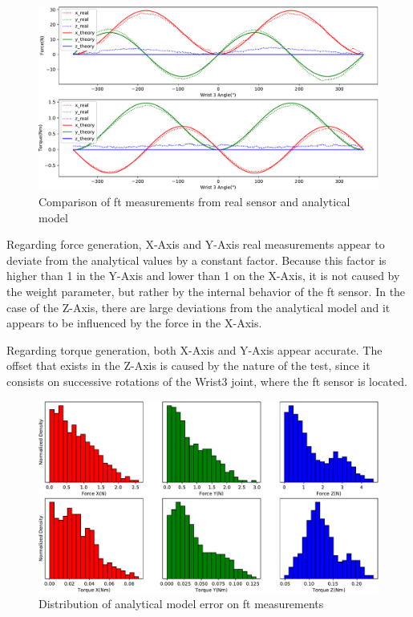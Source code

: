 
\begin{figure}[h]
    \centering
    \includegraphics[width=0.8\linewidth]{figs/chp3/ft_sensor_theory.pdf}
    \caption{Comparison of \ac{ft} measurements from real sensor and analytical model}
    \label{fig:ft_sensor_theory}
\end{figure}

\par Regarding force generation, X-Axis and Y-Axis real measurements appear to deviate from the analytical values by a constant factor. Because this factor is higher than 1 in the Y-Axis and lower than 1 on the X-Axis, it is not caused by the weight parameter, but rather by the internal behavior of the \ac{ft} sensor. In the case of the Z-Axis, there are large deviations from the analytical model and it appears to be influenced by the force in the X-Axis.

\par Regarding torque generation, both X-Axis and Y-Axis appear accurate. The offset that exists in the Z-Axis is caused by the nature of the test, since it consists on successive rotations of the Wrist3 joint, where the \ac{ft} sensor is located.

\begin{figure}[h]
    \centering
    \includegraphics[width=0.8\linewidth]{figs/chp3/ft_sensor_theory_hist.pdf}
    \caption{Distribution of analytical model error on \ac{ft} measurements}
    \label{fig:ft_sensor_theory_hist}
\end{figure}

